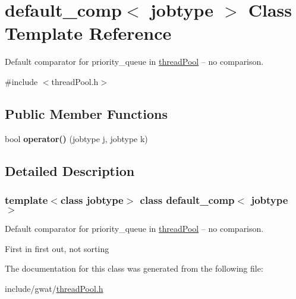 \hypertarget{classdefault__comp}{}\section{default\+\_\+comp$<$ jobtype $>$ Class Template Reference}
\label{classdefault__comp}


Default comparator for priority\+\_\+queue in \hyperlink{classthreadPool}{thread\+Pool} -- no comparison.  




{\ttfamily \#include $<$thread\+Pool.\+h$>$}

\subsection*{Public Member Functions}
\begin{DoxyCompactItemize}
\item 
\mbox{\label{classdefault__comp_a196f2629bf071bb72fcbbd2454ca628e}} 
bool {\bfseries operator()} (jobtype j, jobtype k)
\end{DoxyCompactItemize}


\subsection{Detailed Description}
\subsubsection*{template$<$class jobtype$>$\newline
class default\+\_\+comp$<$ jobtype $>$}

Default comparator for priority\+\_\+queue in \hyperlink{classthreadPool}{thread\+Pool} -- no comparison. 

First in first out, not sorting 

The documentation for this class was generated from the following file\+:\begin{DoxyCompactItemize}
\item 
include/gwat/\hyperlink{threadPool_8h}{thread\+Pool.\+h}\end{DoxyCompactItemize}
